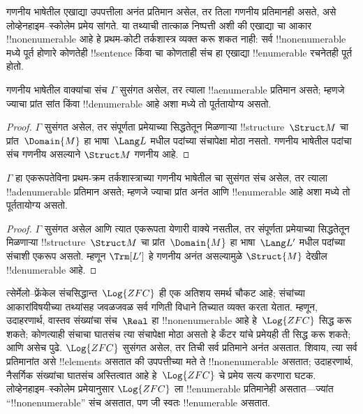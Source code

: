 \documentclass[../../../include/open-logic-section]{subfiles}
\begin{document}

गणनीय भाषेतील एखाद्या उपपत्तीला अनंत प्रतिमान असेल, तर तिला
गणनीय प्रतिमानही असते, असे लोव्हेनहाइम--स्कोलेम प्रमेय सांगते. या
तथ्याची तात्काळ निष्पत्ती अशी की एखाद्या चा आकार
!!{nonenumerable} आहे हे प्रथम-कोटी तर्कशास्त्र व्यक्त करू शकत नाही: सर्व
!!{nonenumerable} मध्ये पूर्त होणारे कोणतेही !!{sentence}
किंवा चा कोणताही संच हा एखाद्या !!{enumerable} रचनेतही
पूर्त होतो.

\begin{thm}
 गणनीय भाषेतील वाक्यांचा संच $\Gamma$ सुसंगत असेल, तर त्याला
!!a{enumerable} प्रतिमान असते; म्हणजे ज्याचा प्रांत सांत किंवा
!!{denumerable} आहे अशा मध्ये तो पूर्ततायोग्य असतो.
\end{thm}

\begin{proof}
$\Gamma$ सुसंगत असेल, तर संपूर्णता प्रमेयाच्या सिद्धतेतून मिळणाऱ्या
!!{structure}~$\Struct M$ चा प्रांत~$\Domain{M}$ हा भाषा~$\Lang L$ मधील
पदांच्या संचापेक्षा मोठा नसतो. गणनीय भाषेतील पदांचा संच गणनीय
असल्याने $\Struct M$ गणनीय आहे.
\end{proof}

\begin{thm}
 $\Gamma$ हा एकरूपतेविना प्रथम-क्रम तर्कशास्त्राच्या
गणनीय भाषेतील चा सुसंगत संच असेल, तर त्याला !!a{denumerable}
प्रतिमान असते; म्हणजे ज्याचा प्रांत अनंत आणि !!{enumerable} आहे अशा
मध्ये तो पूर्ततायोग्य असतो.
\end{thm}

\begin{proof}
$\Gamma$ सुसंगत असेल आणि त्यात एकरूपता येणारी वाक्ये नसतील, तर संपूर्णता
प्रमेयाच्या सिद्धतेतून मिळणाऱ्या !!{structure}~$\Struct M$ चा
प्रांत~$\Domain{M}$ हा भाषा~$\Lang L'$ मधील पदांच्या संचाशी एकरूप असतो.
म्हणून $\Trm[L']$ हे गणनीय अनंत असल्यामुळे $\Struct{M}$ देखील
!!{denumerable} आहे.
\end{proof}

\begin{ex}[स्कोलेमची विरोधापत्ती]
त्सेर्मेलो--फ्रेंकेल संचसिद्धान्त~$\Log{ZFC}$ ही एक अतिशय समर्थ चौकट
आहे; संचांच्या आकारांविषयीच्या तथ्यांसह जवळजवळ सर्व गणिती विधाने तिच्यात
व्यक्त करता येतात. म्हणून, उदाहरणार्थ, वास्तव संख्यांचा संच~$\Real$ हा
!!{nonenumerable} आहे हे~$\Log{ZFC}$ सिद्ध करू शकते; कोणत्याही संचाचा
घातसंच त्या संचापेक्षा मोठा असतो हे कँटर यांचे प्रमेयही ती सिद्ध करू शकते;
आणि असेच पुढे. $\Log{ZFC}$ सुसंगत असेल, तर तिची सर्व प्रतिमाने अनंत
असतात. शिवाय, त्या सर्व प्रतिमानांत असे !!{element}s असतात की उपपत्तीच्या
मते ते !!{nonenumerable} असतात; उदाहरणार्थ, नैसर्गिक संख्यांचा घातसंच
अस्तित्वात आहे हे~$\Log{ZFC}$ चे प्रमेय सत्य करणारा घटक. लोव्हेनहाइम--स्कोलेम
प्रमेयानुसार $\Log{ZFC}$ ला !!{enumerable} प्रतिमानेही असतात---ज्यांत
``!!{nonenumerable}'' संच असतात, पण जी स्वतः !!{enumerable} असतात.
\end{ex}
\end{document}
